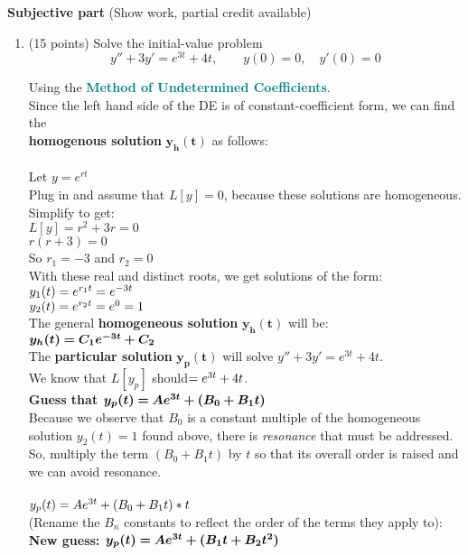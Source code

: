 \documentclass{article}
\begin{document}
\newpage\noindent
{\bf Subjective part} (Show work, partial credit available)

\begin{enumerate}

\item (15 points)  Solve the initial-value problem
\[
y''+3y' = e^{3t} + 4t, \qquad y(0)=0, \quad y'(0)=0
\]

Using the \textcolor{teal}{\textbf{Method of Undetermined Coefficients}}.\\
Since the left hand side of the DE is of constant-coefficient form, we can find the\\\textbf{homogenous solution} $\bm{y_h(t)}$ as follows:\\\\
Let $y = e^{rt}$\\
Plug in and assume that $L[y]=0$, because these solutions are homogeneous. Simplify to get:\\
$L[y] = r^2 + 3r = 0$\\
$r(r+3)= 0$\\
So $r_1 = -3$ and $r_2 = 0$\\

With these real and distinct roots, we get solutions of the form:\\
$y_1(t)=e\sp{r_1 t}= e\sp{-3t}$\\
$y_2(t)=e\sp{r_2 t}= e\sp{0} = 1$\\

The general \textbf{homogeneous solution} $\bm{y_h(t)}$ will be:\\
$\bm{y_h(t) = C_1e\sp{-3t} + C_2}$\\

The \textbf{particular solution} $\bm{y_p(t)}$ will solve $y''+3y' = e^{3t} + 4t$.\\
We know that $L[y_{p}]$ should$= e\sp{3t} + 4t$.\\
\textbf{Guess that $\bm{y_{p}(t) = Ae\sp{3t}+(B_0 + B_1t)}$}\\
Because we observe that $B_0$ is a constant multiple of the homogeneous solution $y_2(t)=1$ found above, there is \emph{resonance} that must be addressed. So, multiply the term $(B_0 + B_1t)$ by $t$ so that its overall order is raised and we can avoid resonance.\\\\
$y_{p}(t) = Ae\sp{3t}+(B_0 + B_1t)*t$\\
(Rename the $B_n$ constants to reflect the order of the terms they apply to):\\
\textbf{New guess: $\bm{y_{p}(t) = Ae\sp{3t}+(B_1t + B_2t^2)}$}\\


\end{enumerate}
\end{document}
